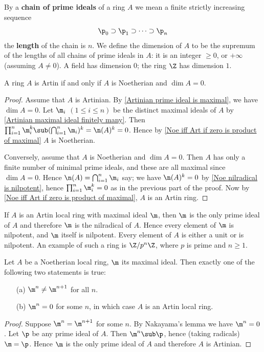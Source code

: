 By a \textbf{chain of prime ideals} of a ring $A$ we mean a finite strictly increasing
sequence 
\[\p_0\supset \p_1\supset\cdots\supset \p_n\]
the \textbf{length} of the chain is $n$. We define the dimension of $A$ to be the supremum of the lengths of all chains of prime ideals in $A$: it is an integer $\geq0$, or $+\infty$ (assuming $A\neq 0$). A field has dimension $0$; the ring $\Z$ has dimension $1$.
\begin{theorem}\label{Artinian iff Noe+dim=0}
A ring $A$ is Artin if and only if $A$ is Noetherian and $\dim A=0$.
\end{theorem}
\begin{proof}
Assume that $A$ is Artinian. By \cref{Artinian prime ideal is maximal}, we have $\dim A=0$. Let $\m_i$ $(1\leq i\leq n)$ be the distinct maximal ideals of $A$ by \cref{Artinian maximal ideal finitely many}. Then $\prod_{i=1}^{n}\m_i^k\sub(\bigcap_{i=1}^n\m_i)^k=\n(A)^k=0$. Hence by \cref{Noe iff Art if zero is product of maximal} $A$ is Noetherian.\par
Conversely, assume that $A$ is Noetherian and $\dim A=0$. Then $A$ has only a finite number of minimal prime ideals, and these are all maximal since $\dim A=0$. Hence $\n(A)=\bigcap_{i=1}^n\m_i$ say; we have $\n(A)^k=0$ by \cref{Noe nilradical is nilpotent}, hence $\prod_{i=1}^{n}\m_i^k=0$ as in the previous part of the proof. Now by \cref{Noe iff Art if zero is product of maximal}, $A$ is an Artin ring.
\end{proof}
If $A$ is an Artin local ring with maximal ideal $\m$, then $\m$ is the only prime ideal of $A$ and therefore $\m$ is the nilradical of $A$. Hence every element of $\m$ is nilpotent, and $\m$ itself is nilpotent. Every element of $A$ is either a unit or is nilpotent. An example of such a ring is $\Z/p^n\Z$, where $p$ is prime and $n\geq1$.
\begin{proposition}\label{Noe local is Artin iff power of maximal ideal}
Let $A$ be a Noetherian local ring, $\m$ its maximal ideal. Then exactly one of the following two statements is true:
\begin{itemize}
\item[(a)] $\m^n\neq\m^{n+1}$ for all $n$.
\item[(b)] $\m^n=0$ for some $n$, in which case $A$ is an Artin local ring.
\end{itemize}
\end{proposition}
\begin{proof}
Suppose $\m^n=\m^{n+1}$ for some $n$. By Nakayama's lemma we have $\m^n=0$. Let $\p$ be any prime ideal of $A$. Then $\m^n\sub\p$, hence (taking radicals) $\m=\p$. Hence $\m$ is the only prime ideal of $A$ and therefore $A$ is Artinian.
\end{proof}
